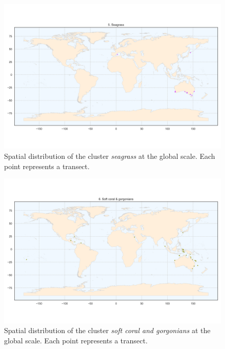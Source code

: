 \begin{figure}
\hypertarget{fig:chap2figS7}{%
\centering
\includegraphics{03-Chapitre2/figures/supplementary/06-spatial-cluster_distribution_cluster_4.png}
\caption{Spatial distribution of the cluster \emph{seagrass} at the
global scale. Each point represents a transect.}\label{fig:chap2figS7}
}
\end{figure}

\begin{figure}
\hypertarget{fig:chap2figS8}{%
\centering
\includegraphics{03-Chapitre2/figures/supplementary/06-spatial-cluster_distribution_cluster_5.png}
\caption{Spatial distribution of the cluster \emph{soft coral and
gorgonians} at the global scale. Each point represents a
transect.}\label{fig:chap2figS8}
}
\end{figure}


